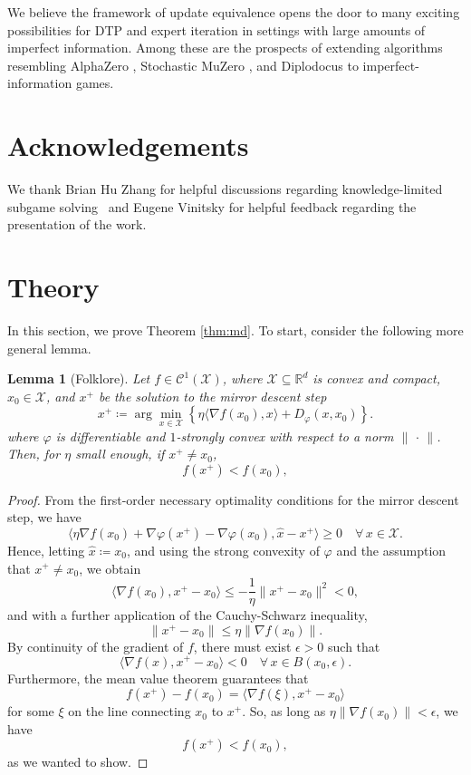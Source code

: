 \documentclass{article} %
\theoremstyle{plain}
\newtheorem{lemma}[theorem]{Lemma}
\theoremstyle{definition}
\theoremstyle{remark}
\begin{document}
We believe the framework of update equivalence opens the door to many exciting possibilities for DTP and expert iteration \citep{exit,exit-thesis} in settings with large amounts of imperfect information.
Among these are the prospects of extending algorithms resembling AlphaZero \citep{az}, Stochastic MuZero \citep{antonoglou2022planning}, and Diplodocus \citep{diplodocus} to imperfect-information games.

\section{Acknowledgements}

We thank Brian Hu Zhang for helpful discussions regarding knowledge-limited subgame solving~\citep{Zhang2021SubgameSW} and Eugene Vinitsky for helpful feedback regarding the presentation of the work.




\newpage
\appendix
\onecolumn

\section{Theory}

In this section, we prove Theorem \ref{thm:md}.
To start, consider the following more general lemma.

\begin{lemma}[Folklore] \label{lem:md}
    Let $f \in \mathcal{C}^1(\mathcal{X})$, where $\mathcal{X}\subseteq\mathbb{R}^d$ is convex and compact, $x_0 \in \mathcal{X}$, and $x^+$ be the solution to the mirror descent step
    \[
        x^+ \coloneqq \arg\min_{x \in \mathcal{X}} \left\{ \eta \langle \nabla f(x_0), x\rangle + D_\varphi(x, x_0) \right\}.
    \]
    where $\varphi$ is differentiable and $1$-strongly convex with respect to a norm $\|\,\cdot\,\|$.
    Then, for $\eta$ small enough, if $x^+ \neq x_0$,
    \[
        f(x^+) < f(x_0),
    \]
\end{lemma}
\begin{proof}
    From the first-order necessary optimality conditions for the mirror descent step, we have
    \[
        \langle \eta \nabla f(x_0) + \nabla \varphi(x^+) - \nabla \varphi(x_0), \hat x - x^+\rangle \geq 0 \quad \forall\, x \in \mathcal{X}.
    \]
    Hence, letting $\hat x \coloneqq x_0$, and using the strong convexity of $\varphi$ and the assumption that $x^+ \neq x_0$, we obtain
    \[
        \langle \nabla f(x_0), x^+ - x_0\rangle \le -\frac{1}{\eta} \|x^+ - x_0\|^2 < 0,
    \]
    and with a further application of the Cauchy-Schwarz inequality,
    \[
        \|x^+ - x_0\| \le \eta \|\nabla f(x_0)\|.
    \]
    By continuity of the gradient of $f$, there must exist $\epsilon > 0$ such that
    \[
        \langle \nabla f(x), x^+ - x_0\rangle < 0 \quad\forall\, x \in B(x_0, \epsilon).
    \]
    Furthermore, the mean value theorem guarantees that
    \[
        f(x^+) - f(x_0) = \langle \nabla f(\xi), x^+ - x_0\rangle
    \]
    for some $\xi$ on the line connecting $x_0$ to $x^+$. So, as long as $\eta \|\nabla f(x_0)\| < \epsilon$, we have
    \[
        f(x^+) < f(x_0),
    \]
    as we wanted to show.
\end{proof}
\end{document}
